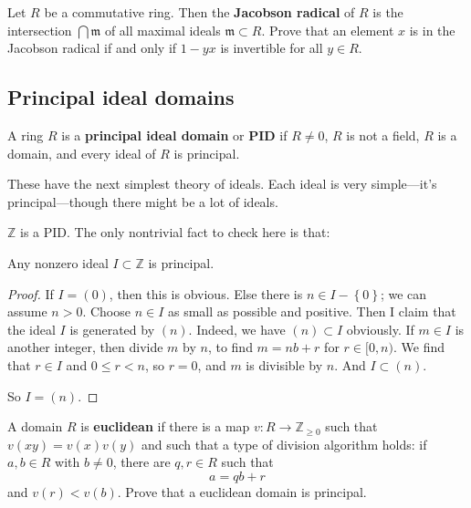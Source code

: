 \begin{exercise}\label{Jacobson} Let $R$ be a commutative ring. Then the
\textbf{Jacobson radical} of $R$ is the intersection $\bigcap \mathfrak{m}$ of
all maximal ideals $\mathfrak{m} \subset R$. Prove that an element $x$ is in
the Jacobson radical if and only if $1 - yx$ is invertible for all $y \in R$.
\end{exercise}

\subsection{Principal ideal domains}

\begin{definition} A ring $R$ is a \textbf{principal ideal domain} or
\textbf{PID} if $R \neq 0$, $R$ is not a field, $R$ is a domain, and every
ideal of $R$ is principal. \end{definition}

These have the next simplest theory of ideals. Each ideal is very simple---it's
principal---though there might be a lot of ideals.

\begin{example} $\mathbb{Z}$ is a PID. The only nontrivial fact to check here
is that: \begin{proposition} Any nonzero ideal $I \subset \mathbb{Z}$ is
principal. \end{proposition} \begin{proof} If $I = (0)$, then this is obvious.
Else there is $n \in I - \left\{0\right\}$; we can assume $n>0$. Choose $n \in
I$ as small as possible and positive. Then I claim that the ideal $I$ is
generated by $(n)$. Indeed, we have $(n) \subset I$ obviously. If $m \in I$ is
another integer, then divide $m$ by $n$, to find $m = nb + r$ for $r \in [0,
n)$. We find that $r \in I$ and $0 \leq r < n$, so $r=0$, and $m$ is divisible
by $n$. And $I \subset (n)$.

So $I = (n)$. \end{proof} \end{example}

\begin{exercise} A domain $R$ is \textbf{euclidean} if there is a map $v: R \to
\mathbb{Z}_{\geq 0}$ such that $v(xy) = v(x)v(y)$ and such that a type of
division algorithm holds: if $a,b \in R$ with $b \neq 0$, there are $q,r \in R$
such that \[ a = qb + r \] and $v(r)< v(b)$. Prove that a euclidean domain is
principal. \end{exercise}

